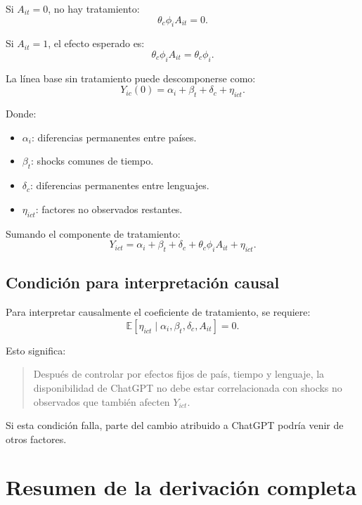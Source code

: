 \documentclass[11pt,a4paper]{article}
\begin{document}
Si \(A_{it}=0\), no hay tratamiento:
\[
\theta_c\phi_i A_{it}=0.
\]

Si \(A_{it}=1\), el efecto esperado es:
\[
\theta_c\phi_i A_{it}=\theta_c\phi_i.
\]

La línea base sin tratamiento puede descomponerse como:
\[
Y_{ic}(0)=\alpha_i+\beta_t+\delta_c+\eta_{ict}.
\]

Donde:

\begin{itemize}
  \item \(\alpha_i\): diferencias permanentes entre países.
  \item \(\beta_t\): shocks comunes de tiempo.
  \item \(\delta_c\): diferencias permanentes entre lenguajes.
  \item \(\eta_{ict}\): factores no observados restantes.
\end{itemize}

Sumando el componente de tratamiento:
\[
Y_{ict}
=
\alpha_i+\beta_t+\delta_c+\theta_c\phi_i A_{it}+\eta_{ict}.
\]

\subsection{Condición para interpretación causal}

Para interpretar causalmente el coeficiente de tratamiento, se requiere:
\[
\mathbb{E}\left[\eta_{ict}\mid \alpha_i,\beta_t,\delta_c,A_{it}\right]=0.
\]

Esto significa:

\begin{quote}
Después de controlar por efectos fijos de país, tiempo y lenguaje, la disponibilidad de ChatGPT no debe estar correlacionada con shocks no observados que también afecten \(Y_{ict}\).
\end{quote}

Si esta condición falla, parte del cambio atribuido a ChatGPT podría venir de otros factores.

\section{Resumen de la derivación completa}
\end{document}
